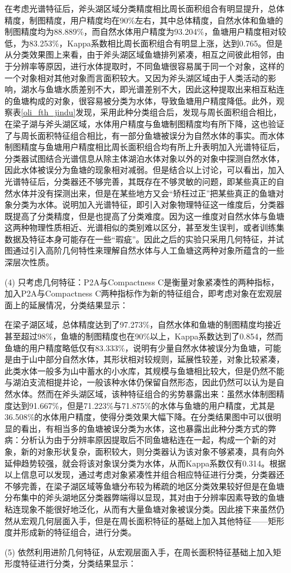 \documentclass[supercite]{upcthesis}
\begin{document}
\begin{itemize}
在考虑光谱特征后，斧头湖区域分类精度相比周长面积组合有明显提升，总体精度，制图精度，用户精度均在90\%左右，其中总体精度，自然水体和鱼塘的制图精度均为88.889\%，而自然水体用户精度为93.204\%，鱼塘用户精度相对较低，为83.253\%，Kappa系数相比周长面积组合有明显上涨，达到0.765。但是从分类效果图上来看，由于斧头湖区域鱼塘排列紧凑，相互之间彼此相邻，由于分辨率等原因，进行水体提取时，不同鱼塘很容易属于同一个对象，这样的一个对象相对其他对象而言面积较大。又因为斧头湖区域由于人类活动的影响，湖水与鱼塘水质差别不大，即光谱差别不大，因此这种提取出来相互粘连的鱼塘构成的对象，很容易被分类为水体，导致鱼塘用户精度降低。此外，观察表\ref{oli_fth_jindu}发现，采用此种分类组合后，发现与周长面积组合相比，在梁子湖与斧头湖区域，水体用户精度与鱼塘制图精度均有所下降，这也验证了与周长面积特征组合相比，有一部分鱼塘被误分为自然水体的事实。而水体制图精度与鱼塘用户精度相比周长面积组合均有所上升表明加入光谱特征后，分类器试图结合光谱信息从除主体湖泊水体对象以外的对象中探测自然水体，因此水体被误分为鱼塘的现象相对减弱。但是结合以上讨论，可以看出，加入光谱特征后，分类器还不够完善，其既存在不够灵敏的问题，即某些真正的自然水体并没有探测出来，但是在某些地方又会“矫枉过正”把某些真正的鱼塘对象分类为水体。说明加入光谱特征，即引入对象物理特征这一维度后，分类器既提高了分类精度，但是也提高了分类难度。因为这一维度对自然水体与鱼塘这两种物理性质相近、光谱相似的类别难以区分，甚至发生误判，或者训练集数据及特征本身可能存在一些“瑕疵”。因此之后的实验只采用几何特征，并试图通过引入高阶几何特性来理解自然水体与人工鱼塘这两种对象所蕴含的一些深层次性质。
\item[(4)]只考虑几何特征：P2A与Compactness C是衡量对象紧凑性的两种指标，加入P2A与Compactness C两种指标作为新的特征组合，即考虑对象在宏观层面上的延展情况，分类结果显示：

在梁子湖区域，总体精度达到了97.273\%，自然水体和鱼塘的制图精度均接近甚至超过98\%，鱼塘的制图精度也在90\%以上，Kappa系数达到了0.854，然而鱼塘的用户精度略低仅有83.333\%，说明有少量自然水体被误分为鱼塘，可能是由于山中部分自然水体，其形状相对较规则，延展性较差，对象比较紧凑，此类水体一般多为山中蓄水的小水库，其规模与鱼塘相比较大，但是仍然不能与湖泊支流相提并论，一般该种水体仍保留自然形态，因此仍然可以认为是自然水体。然而在斧头湖区域，该种特征组合的劣势暴露出来：虽然水体制图精度达到91.667\%，但是71.223\%与71.875\%的水体与鱼塘的用户精度，尤其是36.508\%的水体用户精度，使得分类效果大幅下降。在分类结果图中可以很明显的看出，有相当多的鱼塘被误分类为水体，这也暴露出此种分类方式的弊病：分析认为由于分辨率原因提取后不同鱼塘粘连在一起，构成一个新的对象，新的对象形状复杂，面积较大，则分类器认为该对象不够紧凑，具有向外延伸趋势较强，就会将该对象误分类为水体，从而Kappa系数仅有0.314。根据以上信息可以发现，通过考虑对象紧凑性并组合相应特征进行分类，分类器还不够完善，在梁子湖区域等鱼塘分布较为稀疏的地区分类效果较好但是在鱼塘分布集中的斧头湖地区分类器弊端得以显现，其对由于分辨率因素导致的鱼塘粘连现象不能很好地泛化，从而有大量鱼塘对象被误分类。因此接下来虽然仍然从宏观几何层面入手，但是在周长面积特征的基础上加入其他特征——矩形度并形成新的特征组合，进行分类。
\item[(5)]依然利用进阶几何特征，从宏观层面入手，在周长面积特征基础上加入矩形度特征进行分类，分类结果显示：


\end{itemize}
\end{document}
